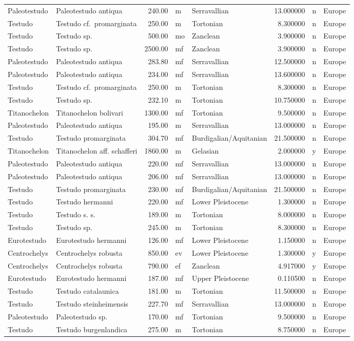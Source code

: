 \documentclass[]{article}
\begin{document}
\begin{longtable}[]{@{}llrllrll@{}}
Paleotestudo & Paleotestudo antiqua & 240.00 & m & Serravallian &
13.000000 & n & Europe\tabularnewline
Testudo & Testudo cf.~promarginata & 250.00 & m & Tortonian & 8.300000 &
n & Europe\tabularnewline
Testudo & Testudo sp. & 500.00 & mo & Zanclean & 3.900000 & n &
Europe\tabularnewline
Testudo & Testudo sp. & 2500.00 & mf & Zanclean & 3.900000 & n &
Europe\tabularnewline
Paleotestudo & Paleotestudo antiqua & 283.80 & mf & Serravallian &
12.500000 & n & Europe\tabularnewline
Paleotestudo & Paleotestudo antiqua & 234.00 & mf & Serravallian &
13.600000 & n & Europe\tabularnewline
Testudo & Testudo cf.~promarginata & 250.00 & m & Tortonian & 8.300000 &
n & Europe\tabularnewline
Testudo & Testudo sp. & 232.10 & m & Tortonian & 10.750000 & n &
Europe\tabularnewline
Titanochelon & Titanochelon bolivari & 1300.00 & mf & Tortonian &
9.500000 & n & Europe\tabularnewline
Paleotestudo & Paleotestudo antiqua & 195.00 & m & Serravallian &
13.000000 & n & Europe\tabularnewline
Testudo & Testudo promarginata & 304.70 & mf & Burdigalian/Aquitanian &
21.500000 & n & Europe\tabularnewline
Titanochelon & Titanochelon aff. schafferi & 1860.00 & m & Gelasian &
2.000000 & y & Europe\tabularnewline
Paleotestudo & Paleotestudo antiqua & 220.00 & mf & Serravallian &
13.000000 & n & Europe\tabularnewline
Paleotestudo & Paleotestudo antiqua & 206.00 & mf & Serravallian &
13.000000 & n & Europe\tabularnewline
Testudo & Testudo promarginata & 230.00 & mf & Burdigalian/Aquitanian &
21.500000 & n & Europe\tabularnewline
Testudo & Testudo hermanni & 220.00 & mf & Lower Pleistocene & 1.300000
& n & Europe\tabularnewline
Testudo & Testudo s. s. & 189.00 & m & Tortonian & 8.000000 & n &
Europe\tabularnewline
Testudo & Testudo sp. & 245.00 & m & Tortonian & 8.300000 & n &
Europe\tabularnewline
Eurotestudo & Eurotestudo hermanni & 126.00 & mf & Lower Pleistocene &
1.150000 & n & Europe\tabularnewline
Centrochelys & Centrochelys robusta & 850.00 & ev & Lower Pleistocene &
1.300000 & y & Europe\tabularnewline
Centrochelys & Centrochelys robusta & 790.00 & ef & Zanclean & 4.917000
& y & Europe\tabularnewline
Eurotestudo & Eurotestudo hermanni & 187.00 & mf & Upper Pleistocene &
0.110500 & n & Europe\tabularnewline
Testudo & Testudo catalaunica & 181.00 & m & Tortonian & 11.500000 & n &
Europe\tabularnewline
Testudo & Testudo steinheimensis & 227.70 & mf & Serravallian &
13.000000 & n & Europe\tabularnewline
Paleotestudo & Paleotestudo sp. & 170.00 & mf & Tortonian & 9.500000 & n
& Europe\tabularnewline
Testudo & Testudo burgenlandica & 275.00 & m & Tortonian & 8.750000 & n
& Europe\tabularnewline

\end{longtable}
\end{document}
